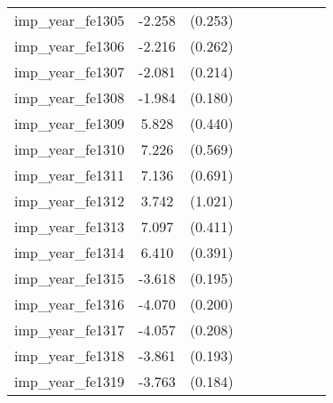 {\begin{tabular}{l*{4}{cc}}
imp\_year\_fe1305&   -2.258\sym{***}&  (0.253)&                  &         &                  &         &                  &         \\
imp\_year\_fe1306&   -2.216\sym{***}&  (0.262)&                  &         &                  &         &                  &         \\
imp\_year\_fe1307&   -2.081\sym{***}&  (0.214)&                  &         &                  &         &                  &         \\
imp\_year\_fe1308&   -1.984\sym{***}&  (0.180)&                  &         &                  &         &                  &         \\
imp\_year\_fe1309&    5.828\sym{***}&  (0.440)&                  &         &                  &         &                  &         \\
imp\_year\_fe1310&    7.226\sym{***}&  (0.569)&                  &         &                  &         &                  &         \\
imp\_year\_fe1311&    7.136\sym{***}&  (0.691)&                  &         &                  &         &                  &         \\
imp\_year\_fe1312&    3.742\sym{***}&  (1.021)&                  &         &                  &         &                  &         \\
imp\_year\_fe1313&    7.097\sym{***}&  (0.411)&                  &         &                  &         &                  &         \\
imp\_year\_fe1314&    6.410\sym{***}&  (0.391)&                  &         &                  &         &                  &         \\
imp\_year\_fe1315&   -3.618\sym{***}&  (0.195)&                  &         &                  &         &                  &         \\
imp\_year\_fe1316&   -4.070\sym{***}&  (0.200)&                  &         &                  &         &                  &         \\
imp\_year\_fe1317&   -4.057\sym{***}&  (0.208)&                  &         &                  &         &                  &         \\
imp\_year\_fe1318&   -3.861\sym{***}&  (0.193)&                  &         &                  &         &                  &         \\
imp\_year\_fe1319&   -3.763\sym{***}&  (0.184)&                  &         &                  &         &                  &         \\

\end{tabular}}
